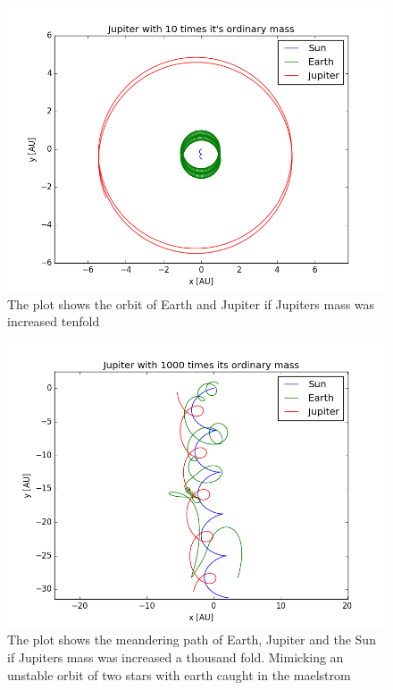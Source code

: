 \begin{figure}[H]
\includegraphics[scale=0.7]{figures/10jup}
\caption{The plot shows the orbit of Earth and Jupiter if Jupiters mass was increased tenfold }\label{fig:ten_j}
\end{figure}

\begin{figure}[H]
\includegraphics[scale=0.7]{figures/1000jup}
\caption{The plot shows the meandering path of Earth, Jupiter and the Sun if Jupiters mass was increased a thousand fold. Mimicking an unstable orbit of two stars with earth caught in the maelstrom}\label{fig:thous_j}
\end{figure}

